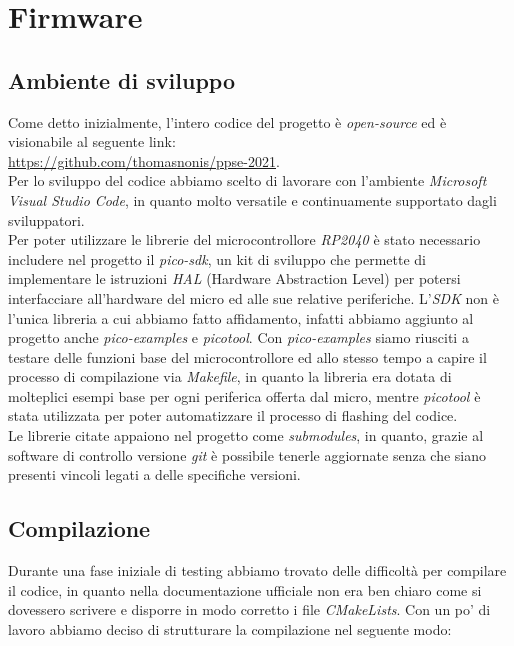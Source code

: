 \chapter{Firmware}

\hypertarget{ambiente-di-sviluppo}{%
\section{Ambiente di sviluppo}\label{ambiente-di-sviluppo}}

Come detto inizialmente, l'intero codice del progetto è \textit{open-source} ed è
visionabile al seguente link:\\
\href{https://github.com/thomasnonis/ppse-2021}{\underline{https://github.com/thomasnonis/ppse-2021}}.\\
Per lo sviluppo del codice abbiamo scelto di lavorare con l'ambiente
\emph{Microsoft Visual Studio Code}, in quanto molto versatile e
continuamente supportato dagli sviluppatori.\\
Per poter utilizzare le librerie del microcontrollore \emph{RP2040} è
stato necessario includere nel progetto il \emph{pico-sdk}, un kit di
sviluppo che permette di implementare le istruzioni \emph{HAL} (Hardware
Abstraction Level) per potersi interfacciare all'hardware del micro ed
alle sue relative periferiche. L'\emph{SDK} non è l'unica libreria a cui abbiamo fatto affidamento, infatti abbiamo aggiunto al progetto
anche \emph{pico-examples} e \emph{picotool}. Con \emph{pico-examples}
siamo riusciti a testare delle funzioni base del microcontrollore ed
allo stesso tempo a capire il processo di compilazione via
\emph{Makefile}, in quanto la libreria era dotata di molteplici esempi
base per ogni periferica offerta dal micro, mentre \emph{picotool} è
stata utilizzata per poter automatizzare il processo di flashing del
codice.\\
Le librerie citate appaiono nel progetto come \emph{submodules}, in
quanto, grazie al software di controllo versione \emph{git} è possibile
tenerle aggiornate senza che siano presenti vincoli legati a delle
specifiche versioni.

\hypertarget{compilazione}{%
\section{Compilazione}\label{compilazione}}

\noindent Durante una fase iniziale di testing abbiamo trovato delle difficoltà
per compilare il codice, in quanto nella documentazione ufficiale non
era ben chiaro come si dovessero scrivere e disporre in modo corretto i
file \textit{CMakeLists}. Con un po' di lavoro abbiamo deciso di strutturare la
compilazione nel seguente modo:

